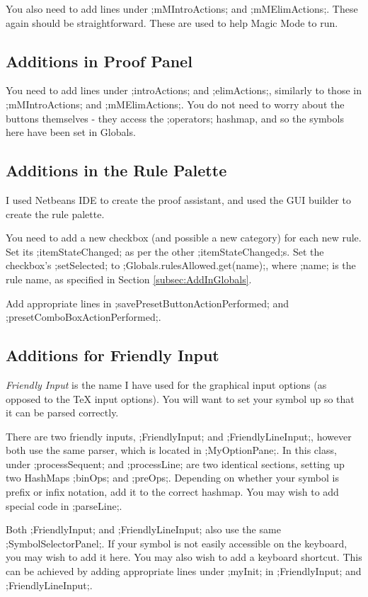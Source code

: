 \documentclass[a4paper]{article}
\begin{document}
You also need to add lines under ;mMIntroActions; and ;mMElimActions;. These again should be straightforward. These are used to help Magic Mode to run.

\subsection{Additions in Proof Panel}
You need to add lines under ;introActions; and ;elimActions;, similarly to those in ;mMIntroActions; and ;mMElimActions;. You do not need to worry about the buttons themselves - they access the ;operators; hashmap, and so the symbols here have been set in Globals.

\subsection{Additions in the Rule Palette}
I used Netbeans IDE to create the proof assistant, and used the GUI builder to create the rule palette.

You need to add a new checkbox (and possible a new category) for each new rule. Set its ;itemStateChanged; as per the other ;itemStateChanged;s. Set the checkbox's ;setSelected; to ;Globals.rulesAllowed.get(name);, where ;name; is the rule name, as specified in Section \ref{subsec:AddInGlobals}.

Add appropriate lines in ;savePresetButtonActionPerformed; and ;presetComboBoxActionPerformed;.

\subsection{Additions for Friendly Input}
\emph{Friendly Input} is the name I have used for the graphical input options (as opposed to the {\TeX} input options). You will want to set your symbol up so that it can be parsed correctly.

There are two friendly inputs, ;FriendlyInput; and ;FriendlyLineInput;, however both use the same parser, which is located in ;MyOptionPane;. In this class, under ;processSequent; and ;processLine; are two identical sections, setting up two HashMaps ;binOps; and ;preOps;. Depending on whether your symbol is prefix or infix notation, add it to the correct hashmap. You may wish to add special code in ;parseLine;.

Both ;FriendlyInput; and ;FriendlyLineInput; also use the same ;SymbolSelectorPanel;. If your symbol is not easily accessible on the keyboard, you may wish to add it here. You may also wish to add a keyboard shortcut. This can be achieved by adding appropriate lines under ;myInit; in ;FriendlyInput; and ;FriendlyLineInput;.
\end{document}
